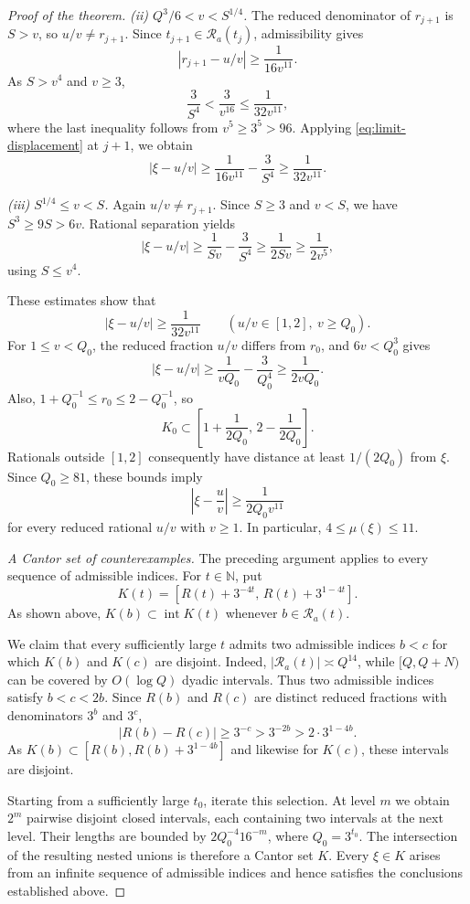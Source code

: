 \documentclass[11pt,reqno]{amsart}
\theoremstyle{definition}
\theoremstyle{plain}
\theoremstyle{definition}
\theoremstyle{remark}
\newcommand{\RR}{\mathcal R}
\begin{document}
\begin{proof}[Proof of the theorem]
\smallskip
\noindent\emph{(ii) $Q^3/6<v<S^{1/4}$.}
The reduced denominator of $r_{j+1}$ is $S>v$,
so $u/v\ne r_{j+1}$. Since
$t_{j+1}\in\RR_a(t_j)$, admissibility gives
\[
 |r_{j+1}-u/v|\ge\frac1{16v^{11}}.
\]
As $S>v^4$ and $v\ge3$,
\[
 \frac3{S^4}<\frac3{v^{16}}
 \le\frac1{32v^{11}},
\]
where the last inequality follows from
$v^5\ge3^5>96$. Applying
\eqref{eq:limit-displacement} at $j+1$, we obtain
\[
 |\xi-u/v|
 \ge\frac1{16v^{11}}-\frac3{S^4}
 \ge\frac1{32v^{11}}.
\]

\smallskip
\noindent\emph{(iii) $S^{1/4}\le v<S$.}
Again $u/v\ne r_{j+1}$. Since $S\ge3$ and $v<S$,
we have $S^3\ge9S>6v$. Rational separation yields
\[
 |\xi-u/v|
 \ge\frac1{Sv}-\frac3{S^4}
 \ge\frac1{2Sv}\ge\frac1{2v^5},
\]
using $S\le v^4$.

\smallskip
These estimates show that
\[
 |\xi-u/v|\ge\frac1{32v^{11}}
 \qquad(u/v\in[1,2],\ v\ge Q_0).
\]
For $1\le v<Q_0$, the reduced fraction $u/v$
differs from $r_0$, and $6v<Q_0^3$ gives
\[
 |\xi-u/v|
 \ge\frac1{vQ_0}-\frac3{Q_0^4}
 \ge\frac1{2vQ_0}.
\]
Also, $1+Q_0^{-1}\le r_0\le2-Q_0^{-1}$, so
\[
 K_0\subset
 \left[1+\frac1{2Q_0},\,2-\frac1{2Q_0}\right].
\]
Rationals outside $[1,2]$ consequently have distance
at least $1/(2Q_0)$ from $\xi$.
Since $Q_0\ge81$, these bounds imply
\[
 \left|\xi-\frac uv\right|
 \ge\frac1{2Q_0v^{11}}
\]
for every reduced rational $u/v$ with $v\ge1$.
In particular, $4\le\mu(\xi)\le11$.


\smallskip
\noindent\emph{A Cantor set of counterexamples.}
The preceding argument applies to every sequence of admissible
indices. For $t\in\mathbb N$, put
\[
 K(t)=[R(t)+3^{-4t},\,R(t)+3^{1-4t}].
\]
As shown above, $K(b)\subset\operatorname{int}K(t)$ whenever
$b\in\RR_a(t)$.

We claim that every sufficiently large $t$ admits two admissible
indices $b<c$ for which $K(b)$ and $K(c)$ are disjoint.
Indeed, $|\RR_a(t)|\asymp Q^{14}$, while $[Q,Q+N)$ can be
covered by $O(\log Q)$ dyadic intervals. Thus two admissible
indices satisfy $b<c<2b$. Since $R(b)$ and $R(c)$ are distinct
reduced fractions with denominators $3^b$ and $3^c$,
\[
 |R(b)-R(c)|\ge3^{-c}>3^{-2b}
 >2\cdot3^{1-4b}.
\]
As $K(b)\subset[R(b),R(b)+3^{1-4b}]$ and likewise for
$K(c)$, these intervals are disjoint.

Starting from a sufficiently large $t_0$, iterate this
selection. At level $m$ we obtain $2^m$ pairwise disjoint
closed intervals, each containing two intervals at the
next level. Their lengths are bounded by
$2Q_0^{-4}16^{-m}$, where $Q_0=3^{t_0}$.
The intersection of the resulting nested unions is
therefore a Cantor set $K$. Every $\xi\in K$ arises
from an infinite sequence of admissible indices and
hence satisfies the conclusions established above.
\end{proof}
\end{document}
